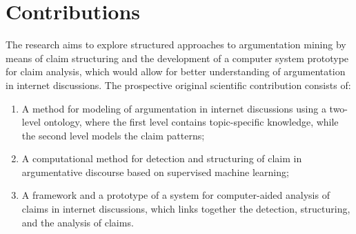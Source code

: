 % 

\section{Contributions}

The research aims to explore structured approaches to
argumentation mining by means of claim structuring and the
development of a computer system prototype for claim analysis, which would
allow for better understanding of argumentation in internet discussions. 
The prospective original scientific contribution consists of: 
\begin{enumerate}
\item A method for modeling of argumentation in internet discussions using a
two-level ontology, where the first level contains topic-specific knowledge,
while the second level models the claim patterns;
\item A computational method for detection and
structuring of claim in argumentative discourse based on supervised machine
learning;
\item A framework and a prototype of a system for computer-aided
analysis of claims in internet discussions, which links together the detection,
structuring, and the analysis of claims.  
\end{enumerate}

